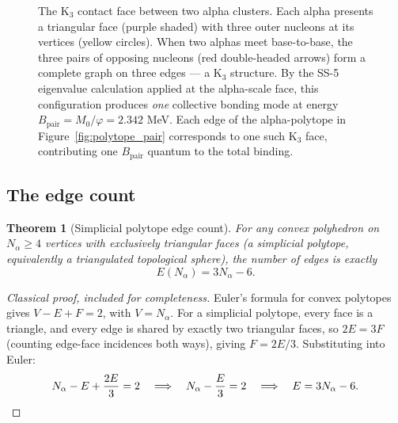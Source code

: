 \documentclass[11pt,letterpaper]{article}
\newtheorem{theorem}{Theorem}[section]
\newcommand{\phig}{\varphi}
\newcommand{\Mzero}{M_0}
\newcommand{\Bpair}{B_{\mathrm{pair}}}
\newcommand{\Nalpha}{N_{\alpha}}
\begin{document}
\begin{figure}[H]
\caption{The K$_3$ contact face between two alpha clusters. Each alpha presents a triangular face (purple shaded) with three outer nucleons at its vertices (yellow circles). When two alphas meet base-to-base, the three pairs of opposing nucleons (red double-headed arrows) form a complete graph on three edges --- a K$_3$ structure. By the SS-5 eigenvalue calculation applied at the alpha-scale face, this configuration produces \emph{one} collective bonding mode at energy $\Bpair = \Mzero/\phig = 2.342$ MeV. Each edge of the alpha-polytope in Figure~\ref{fig:polytope_pair} corresponds to one such K$_3$ face, contributing one $\Bpair$ quantum to the total binding.}
\label{fig:K3_face}
\end{figure}

\subsection{The edge count}

\begin{theorem}[Simplicial polytope edge count]
\label{thm:3N6}
For any convex polyhedron on $\Nalpha \geq 4$ vertices with exclusively triangular faces (a simplicial polytope, equivalently a triangulated topological sphere), the number of edges is exactly
\[
E(\Nalpha) = 3\Nalpha - 6.
\]
\end{theorem}

\begin{proof}[Classical proof, included for completeness]
Euler's formula for convex polytopes gives $V - E + F = 2$, with $V = \Nalpha$. For a simplicial polytope, every face is a triangle, and every edge is shared by exactly two triangular faces, so $2E = 3F$ (counting edge-face incidences both ways), giving $F = 2E/3$. Substituting into Euler:
\[
\Nalpha - E + \frac{2E}{3} = 2 \quad\Longrightarrow\quad \Nalpha - \frac{E}{3} = 2 \quad\Longrightarrow\quad E = 3\Nalpha - 6. \qedhere
\]
\end{proof}
\end{document}
